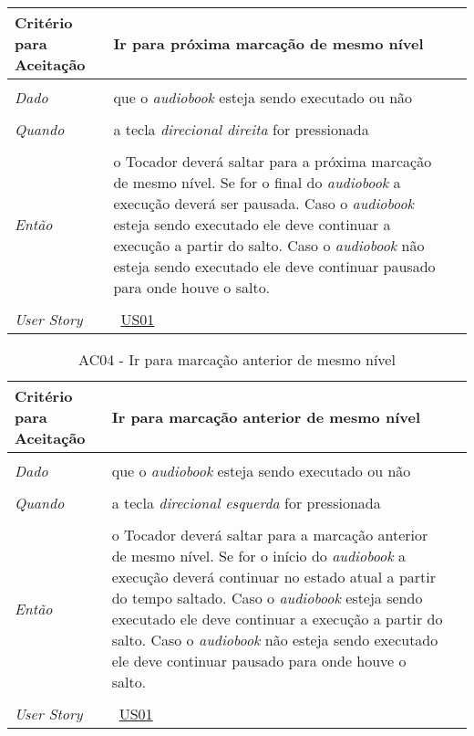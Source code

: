 \begin{apendicesenv}
\begin{table}[ht]
\begin{center}
\begin{tabularx}{\textwidth}{|lX|l|}
\hline
\textbf{Critério para Aceitação} & Ir para próxima marcação de mesmo nível \\
\hline
 & \\
\textit{Dado} & que o \textit{audiobook} esteja sendo executado ou não \\
 & \\
\textit{Quando} & a tecla \textit{direcional direita} for pressionada \\
 & \\
\textit{Então} & o Tocador deverá saltar para a próxima marcação de mesmo nível. Se for o final do \textit{audiobook} a execução deverá ser pausada. Caso o \textit{audiobook} esteja sendo executado ele deve continuar a execução a partir do salto. Caso o \textit{audiobook} não esteja sendo executado ele deve continuar pausado para onde houve o salto. \\
 & \\
\hline
\textit{User Story} & ~\hyperref[tab:us01]{US01} \\
\hline

\end{tabularx}
\end{center}
\label{tab:us01a3}
\end{table}


\begin{table}[ht]
\centering
\caption{AC04 - Ir para marcação anterior de mesmo nível}
\vspace{0.1cm}
\begin{center}
\begin{tabularx}{\textwidth}{|lX|l|}

\hline
\textbf{Critério para Aceitação} & Ir para marcação anterior de mesmo nível \\
\hline
 & \\
\textit{Dado} & que o \textit{audiobook} esteja sendo executado ou não \\
 & \\
\textit{Quando} & a tecla \textit{direcional esquerda} for pressionada \\ 
 & \\
\textit{Então} & o Tocador deverá saltar para a marcação anterior de mesmo nível. Se for  o início do \textit{audiobook} a execução deverá continuar no estado atual a partir do tempo saltado. Caso o \textit{audiobook} esteja sendo executado ele deve continuar a execução a partir do salto. Caso o \textit{audiobook} não esteja sendo executado ele deve continuar pausado para onde houve o salto. \\
 & \\
\hline
\textit{User Story} & ~\hyperref[tab:us01]{US01} \\
\hline


\end{tabularx}
\end{center}
\end{table}
\end{apendicesenv}
